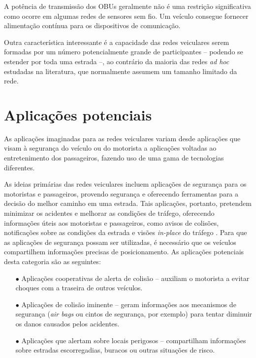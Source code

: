 A potência de transmissão dos OBUs geralmente não é uma restrição significativa
como ocorre em algumas redes de sensores sem fio. Um veículo consegue fornecer
alimentação contínua para os dispositivos de comunicação.

Outra característica interessante é a capacidade das redes veiculares 
serem formadas por um número potencialmente grande de participantes -- 
podendo se estender por toda uma estrada --, ao contrário da maioria 
das redes \textit{ad hoc} estudadas na literatura, que normalmente assumem um 
tamanho limitado da rede. 

\section{Aplicações potenciais}
As aplicações imaginadas para as redes veiculares variam desde aplicações que
visam à segurança do veículo ou do motorista a aplicações voltadas ao
entretenimento dos passageiros, fazendo uso de uma gama de tecnologias
diferentes.

As ideias primárias das redes veiculares incluem aplicações de segurança para
os motoristas e passageiros, provendo segurança e oferecendo ferramentas para a
decisão do melhor caminho em uma estrada. Tais aplicações, portanto, pretendem
minimizar os acidentes e melhorar as condições de tráfego, oferecendo informações 
úteis aos motoristas e passageiros, como avisos de colisões, notificações
sobre as condições da estrada e visões \textit{in-place} do tráfego
\cite{moustafa2009vehicular}. Para que as aplicações de segurança possam ser 
utilizadas, é necessário que os veículos compartilhem informações precisas de 
posicionamento. As aplicações potenciais desta categoria são as seguintes:

\begin{enumerate}
 \item[$\bullet$] Aplicações cooperativas de alerta de colisão -- auxiliam o
 motorista a evitar choques com a traseira de outros veículos.
 \item[$\bullet$] Aplicações de colisão iminente -- geram informações aos
 mecanismos de segurança (\textit{air bags} ou cintos de segurança, por exemplo)
 para tentar diminuir os danos causados pelos acidentes.
 \item[$\bullet$] Aplicações que alertam sobre locais perigosos -- compartilham
 informações sobre estradas escorregadias, buracos ou outras situações de risco.
\end{enumerate}

